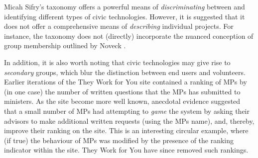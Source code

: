 Micah Sifry’s taxonomy offers a powerful means of \emph{discriminating} between and identifying different types of civic technologies.
However, it is suggested that it does not offer a comprehensive means of \emph{describing} individual projects.
For instance, the taxonomy does not (directly) incorporate the nuanced conception of group membership outlined by Noveck \cite{noveck}.

In addition, it is also worth noting that civic technologies may give rise to \emph{secondary} groups, which blur the distinction between end users and volunteers.
Earlier iterations of the They Work for You site contained a ranking of MPs by (in one case) the number of written questions that the MPs has submitted to ministers.
As the site become more well known, anecdotal evidence suggested that a small number of MPs had attempting to \emph{game} the system by asking their advisors to make additional written requests (using the MPs name), and, thereby, improve their ranking on the site.
This is an interesting circular example, where (if true) the behaviour of MPs was modified by the presence of the ranking indicator within the site.
They Work for You have since removed such rankings.